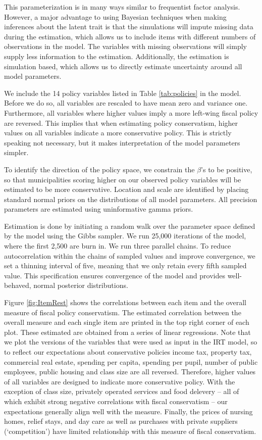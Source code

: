 \documentclass[a4paper,12pt]{article}
\begin{document}
This parameterization is in many ways similar to frequentist factor analysis. However, a major advantage to using Bayesian techniques when making inferences about the latent trait is that the simulations will impute missing data during the estimation, which allows us to include items with different numbers of observations in the model. The variables with missing observations will simply supply less information to the estimation. Additionally, the estimation is simulation based, which allows us to directly estimate uncertainty around all model parameters. 

We include the 14 policy variables listed in Table  \ref{tab:policies} in the model. Before we do so, all variables are rescaled to have mean zero and variance one. Furthermore, all variables where higher values imply a more left-wing fiscal policy are reversed. This implies that when estimating policy conservatism, higher values on all variables indicate a more conservative policy. This is strictly speaking not necessary, but it makes interpretation of the model parameters simpler.

To identify the direction of the policy space, we constrain the $\beta$'s to be positive, so that municipalities scoring higher on our observed policy variables will be estimated to be more conservative. Location and scale are identified by placing standard normal priors on the distributions of all model parameters. All precision parameters are estimated using uninformative gamma priors.

Estimation is done by initiating a random walk over the parameter space defined by the model using the Gibbs sampler. We run 25,000 iterations of the model, where the first 2,500 are burn in. We run three parallel chains. To reduce autocorrelation within the chains of sampled values and improve convergence, we set a thinning interval of five, meaning that we only retain every fifth sampled value. This specification ensures  convergence of the model and provides well-behaved, normal posterior distributions.

Figure \ref{fig:ItemRest} shows the correlations between each item and the overall measure of fiscal policy conservatism. The estimated correlation between the overall measure and each single item are printed in the top right corner of each plot. These estimated are obtained from a series of linear regressions. Note that we plot the versions of the variables that were used as input in the IRT model, so to reflect our expectations about conservative policies income tax, property tax, commercial real estate, spending per capita, spending per pupil, number of public employees, public housing and class size are all reversed. Therefore, higher values of all variables are designed to indicate more conservative policy. With the exception of class size, privately operated services and food delevery -- all of which exhibit strong negative correlations with fiscal conservatism -- our expectations generally align well with the measure. Finally, the prices of nursing homes, relief stays, and day care as well as purchases with private suppliers (`competition') have limited relationship with this measure of fiscal conservatism. 
\end{document}
